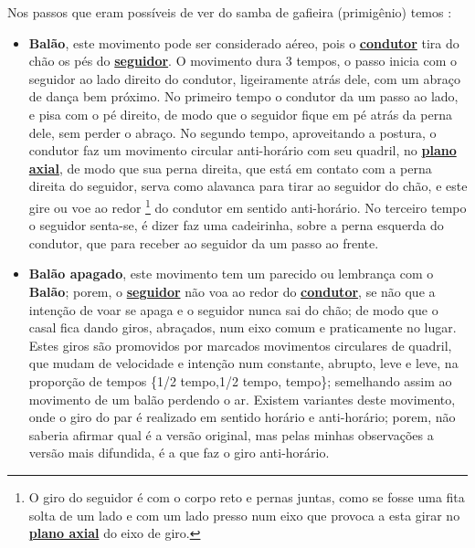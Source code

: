 Nos passos que eram possíveis de ver do samba de gafieira (primigênio) temos \cite[pp. 142]{perna2002samba}:
\begin{itemize}
\item \textbf{Balão}, 
este movimento pode ser considerado aéreo, 
pois o \hyperref[def:Condutor]{\textbf{condutor}} tira do chão os pés do \hyperref[def:Seguidor]{\textbf{seguidor}}.
O movimento dura 3 tempos, o passo inicia com o seguidor ao lado direito do condutor, 
ligeiramente atrás dele, com um abraço de dança bem próximo.
No primeiro tempo o condutor da um passo ao lado, e pisa com o pé direito,
de modo que o seguidor fique em pé atrás da perna dele, sem perder o abraço.
No segundo tempo, aproveitando a postura, 
o condutor faz um movimento circular anti-horário com seu quadril, no \hyperref[def:PlanoAxial]{\textbf{plano axial}},
de modo que sua perna direita, que está em contato com a perna direita do seguidor,
serva como alavanca para tirar ao seguidor do chão, 
e este gire ou voe ao redor \footnote{O giro do seguidor é com o corpo reto e pernas juntas, 
como se fosse uma fita solta de um lado e com um lado presso num eixo que provoca a esta girar no \hyperref[def:PlanoAxial]{\textbf{plano axial}} do eixo de giro.} 
do condutor em sentido anti-horário.
No terceiro tempo o seguidor senta-se, é dizer faz uma cadeirinha, sobre a perna esquerda do condutor,
que para receber ao seguidor da um passo ao frente. 

\item \textbf{Balão apagado},
 este movimento tem um parecido ou lembrança com o \textbf{Balão}; 
porem, o \hyperref[def:Seguidor]{\textbf{seguidor}} não voa ao redor do \hyperref[def:Condutor]{\textbf{condutor}}, 
se não que a intenção de voar se apaga e o seguidor nunca sai do chão; 
de modo que o casal fica dando giros, abraçados, num eixo comum e praticamente no lugar. 
Estes giros são promovidos por marcados movimentos circulares de quadril, que mudam
de velocidade e intenção num constante, abrupto, leve e leve,  na proporção de tempos \{1/2 tempo,1/2 tempo, tempo\}; 
semelhando assim ao movimento de um balão perdendo o ar.
Existem variantes deste movimento, onde o giro do par é realizado em sentido horário e anti-horário; porem, 
não saberia afirmar qual é a versão original, mas pelas minhas observações a versão mais difundida,
é a que faz o giro  anti-horário.


\end{itemize}
